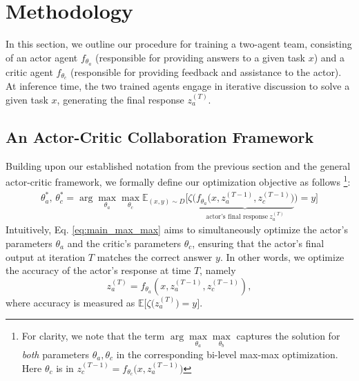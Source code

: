 \section{Methodology}\label{sec:method}
In this section, we outline our procedure for training a two-agent team, consisting of an actor agent \(f_{\theta_a}\) (responsible for providing answers to a given task \(x\)) and a critic agent \(f_{\theta_c}\) (responsible for providing feedback and assistance to the actor).
At inference time, the two trained agents engage in iterative discussion to solve a given task \(x\), generating the final response $z_a^{(T)}$.


\subsection{An Actor-Critic Collaboration Framework}
Building upon our established notation from the previous section and the general actor-critic framework, we formally define our optimization objective as follows \footnote{For clarity, we note that the term $\arg\max\limits_{\theta_a}\max\limits_{\theta_b}$ captures the solution for \emph{both} parameters $\theta_a, \theta_c$ in the corresponding bi-level max-max optimization. Here $\theta_c$ is in $z_c^{(T-1)} = f_{\theta_c}\big(x, z_a^{(T-1)}\big)$}:
\begin{align}\label{eq:main_max_max}
\theta_a^*,\, \theta_c^* = \arg \max_{\theta_a} \max_{\theta_c} \mathbb{E}_{(x, y)\sim D}\bigg[ \zeta\bigg( \underbrace{f_{\theta_a}\big(x, z_a^{(T-1)}, z_c^{(T-1)}\big)}_{\text{actor's final response}~z_a^{(T)}} \bigg) = y \bigg]
\end{align}
Intuitively, Eq. \ref{eq:main_max_max} aims to simultaneously optimize the actor's parameters $\theta_a$ and the critic's parameters $\theta_c$, ensuring that the actor's final output at iteration $T$ matches the correct answer $y$. 
In other words, we optimize the accuracy of the actor's response at time $T$, namely 
\[
z_a^{(T)} = f_{\theta_a}\left(x, z_a^{(T-1)}, z_c^{(T-1)}\right),
\]
 where accuracy is measured as $\mathbb{E}\big[\zeta\big(z_a^{(T)} \big)=y \big]$.

